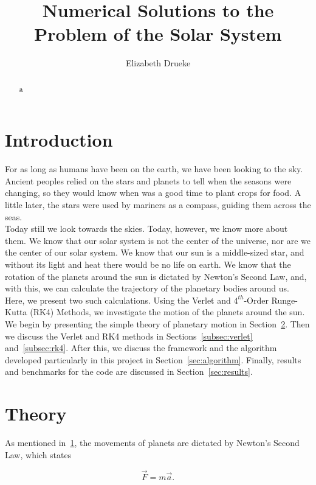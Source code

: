 \documentclass[12pt]{article}
\title{Numerical Solutions to the Problem of the Solar System}
\author{Elizabeth Drueke}
\numberwithin{equation}{section}
\begin{document}
\maketitle

\begin{abstract}


a
\end{abstract}

\section{Introduction}
\label{sec:intro}

For as long as humans have been on the earth, we have been looking to the sky.  Ancient peoples relied on the stars and planets to tell when the seasons were changing, so they would know when was a good time to plant crops for food.  A little later, the stars were used by mariners as a compass, guiding them across the seas.  
\\\indent Today still we look towards the skies.  Today, however, we know more about them.  We know that our solar system is not the center of the universe, nor are we the center of our solar system.  We know that our sun is a middle-sized star, and without its light and heat there would be no life on earth.  We know that the rotation of the planets around the sun is dictated by Newton's Second Law, and, with this, we can calculate the trajectory of the planetary bodies around us.  
\\\indent Here, we present two such calculations.  Using the Verlet and $4^{th}$-Order Runge-Kutta (RK4) Methods, we investigate the motion of the planets around the sun.  We begin by presenting the simple theory of planetary motion in Section~\ref{sec:theory}.  Then we discuss the Verlet and RK4 methods in Sections~\ref{subsec:verlet} and~\ref{subsec:rk4}.  After this, we discuss the framework and the algorithm developed particularly in this project in Section~\ref{sec:algorithm}.  Finally, results and benchmarks for the code are discussed in Section~\ref{sec:results}.

\section{Theory}
\label{sec:theory}

As mentioned in~\ref{sec:intro}, the movements of planets are dictated by Newton's Second Law, which states

$$\vec{F} = m\vec{a}.$$
\end{document}
